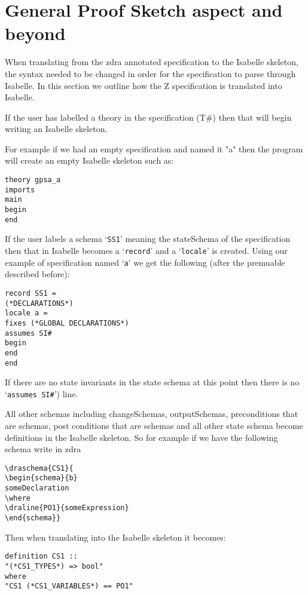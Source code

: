\chapter{General Proof Sketch aspect and beyond}
\label{chap:gpsa2isa}

When translating from the \gls{zdra} annotated specification to the Isabelle
skeleton, the syntax needed to be changed in order for the specification to
parse through Isabelle. In this section we outline how the Z specification is
translated into Isabelle.

If the user has labelled a theory in the specification (T\#) then that will
begin writing an Isabelle skeleton.

For example if we had an empty specification and named it "a" then the program
will create an empty Isabelle skeleton such as:

\begin{verbatim}
theory gpsa_a
imports
main
begin
end
\end{verbatim}

If the user labels a schema `\texttt{SS1}' meaning the stateSchema of the
specification then that in Isabelle becomes a `\texttt{record}' and a
`\texttt{locale}' is created. Using our example of specification named
`\texttt{a}' we get the following (after the premuable described before):
\begin{verbatim}
record SS1 =
(*DECLARATIONS*)
locale a =
fixes (*GLOBAL DECLARATIONS*)
assumes SI#
begin
end
end
\end{verbatim}

If there are no state invariants in the state schema at this point then there is
no `\texttt{assumes SI\#}') line.

All other schemas including changeSchemas, outputSchemas, preconditions that are
schemas, post conditions that are schemas and all other state schema become
definitions in the Isabelle skeleton. So for example if we have the following
schema write in \gls{zdra}
\begin{verbatim}
\draschema{CS1}{
\begin{schema}{b}
someDeclaration
\where
\draline{PO1}{someExpression}
\end{schema}}
\end{verbatim}

Then when translating into the Isabelle skeleton it becomes:
\begin{verbatim}
definition CS1 ::
"(*CS1_TYPES*) => bool"
where
"CS1 (*CS1_VARIABLES*) == PO1"
\end{verbatim}

